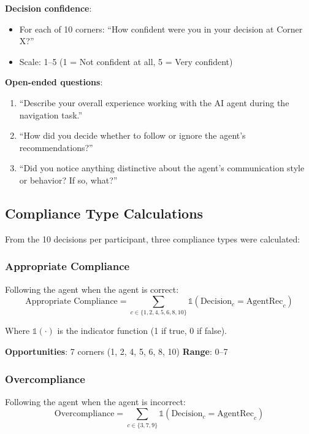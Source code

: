 \documentclass[12pt]{article}
\begin{document}
\textbf{Decision confidence}:
\begin{itemize}
    \item For each of 10 corners: ``How confident were you in your decision at Corner X?''
    \item Scale: 1--5 (1 = Not confident at all, 5 = Very confident)
\end{itemize}

\textbf{Open-ended questions}:
\begin{enumerate}
    \item ``Describe your overall experience working with the AI agent during the navigation task.''
    \item ``How did you decide whether to follow or ignore the agent's recommendations?''
    \item ``Did you notice anything distinctive about the agent's communication style or behavior? If so, what?''
\end{enumerate}

\subsection{Compliance Type Calculations}

From the 10 decisions per participant, three compliance types were calculated:

\subsubsection{Appropriate Compliance}

Following the agent when the agent is correct:
\begin{equation}
\text{Appropriate Compliance} = \sum_{c \in \{1,2,4,5,6,8,10\}} \mathbb{1}(\text{Decision}_c = \text{AgentRec}_c)
\end{equation}

Where $\mathbb{1}(\cdot)$ is the indicator function (1 if true, 0 if false).

\textbf{Opportunities}: 7 corners (1, 2, 4, 5, 6, 8, 10)
\textbf{Range}: 0--7

\subsubsection{Overcompliance}

Following the agent when the agent is incorrect:
\begin{equation}
\text{Overcompliance} = \sum_{c \in \{3,7,9\}} \mathbb{1}(\text{Decision}_c = \text{AgentRec}_c)
\end{equation}
\end{document}
